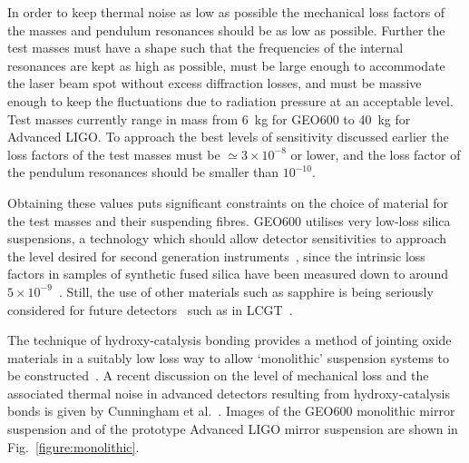\documentclass{article}
\begin{document}
In order to keep thermal noise as low as possible the mechanical loss factors of
the masses and pendulum resonances should be as low as possible. Further the
test masses must have a shape such that the frequencies of the internal
resonances are kept as high as possible, must be large enough to accommodate the
laser beam spot without excess diffraction losses, and must be massive enough to
keep the fluctuations due to radiation pressure at an acceptable level. Test
masses currently range in mass from 6~kg for GEO600 to 40~kg for Advanced LIGO.
To approach the best levels of sensitivity discussed earlier the loss factors of
the test masses must be $\simeq 3 \times 10^{-8}$ or lower, and the loss factor
of the pendulum resonances should be smaller than $10^{-10}$.

Obtaining these values puts significant constraints on the choice of material
for the test masses and their suspending fibres. GEO600 utilises very low-loss
silica suspensions, a technology which should allow detector sensitivities to
approach the level desired for second generation instruments~\cite{Braginsky1,
Rowan1, Rowan2}, since the intrinsic loss factors in samples of synthetic fused
silica have been measured down to around $5\times 10^{-9}$~\cite{Ageev:2004}.
Still, the use of other materials such as sapphire is being seriously considered
for future detectors~\cite{Braginsky2, Ju2, Rowan1} such as in
LCGT~\cite{Miyoki:2005, Ohashi:2008}.

The technique of hydroxy-catalysis bonding provides a method of jointing oxide
materials in a suitably low loss way to allow `monolithic' suspension systems to
be constructed~\cite{Rowan3}. A recent discussion on the level of mechanical
loss and the associated thermal noise in advanced detectors resulting from
hydroxy-catalysis bonds is given by Cunningham et al.~\cite{Cunningham:2010}.
Images of the GEO600 monolithic mirror suspension and of the prototype Advanced
LIGO mirror suspension are shown in Fig.~\ref{figure:monolithic}.

\end{document}
